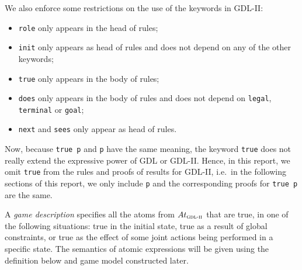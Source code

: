 \documentclass{article}
\theoremstyle{theorem}
\theoremstyle{lemma}
\theoremstyle{definition}
\theoremstyle{remark}
\begin{document}
\par We also enforce some restrictions on the use of the keywords in GDL-II:
\begin{itemize}
    \item \texttt{role} only appears in the head of rules;
    \item \texttt{init} only appears as head of rules and does not depend on any of the other keywords;
    \item \texttt{true} only appears in the body of rules;
    \item \texttt{does} only appears in the body of rules and does not depend on \texttt{legal}, \texttt{terminal} or \texttt{goal};
    \item \texttt{next} and \texttt{sees} only appear as head of rules.
\end{itemize}
\par Now, because \texttt{true p} and \texttt{p} have the same meaning, the keyword \texttt{true} does not really extend the expressive power of GDL or GDL-II. Hence, in this report, we omit \texttt{true} from the rules and proofs of results for GDL-II, i.e.\ in the following sections of this report, we only include \texttt{p} and the corresponding proofs for \texttt{true p} are the same.
\par A \textit{game description} specifies all the atoms from $At_\textsc{gdl-ii}$ that are true, in one of the following situations: true in the initial state, true as a result of global constraints, or true as the effect of some joint actions being performed in a specific state. The semantics of atomic expressions will be given using the definition below and game model constructed later.
\end{document}
